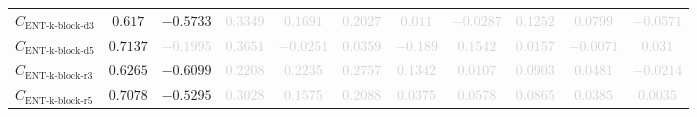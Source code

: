 \documentclass{standalone}
\newcommand{\entkblockdthreename}{\text{ENT-k-block-d3}}
\newcommand{\entkblockdthree}{C_{\entkblockdthreename}}
\newcommand{\entkblockdfivename}{\text{ENT-k-block-d5}}
\newcommand{\entkblockdfive}{C_{\entkblockdfivename}}
\newcommand{\entkblockrthreename}{\text{ENT-k-block-r3}}
\newcommand{\entkblockrthree}{C_{\entkblockrthreename}}
\newcommand{\entkblockrfivename}{\text{ENT-k-block-r5}}
\newcommand{\entkblockrfive}{C_{\entkblockrfivename}}
\begin{document}
\begin{tabular}{lcccccccccc}
$\entkblockdthree$ & $0.617$ & $-0.5733$ & \textcolor{lightgray}{$0.3349$} & \textcolor{lightgray}{$0.1691$} & \textcolor{lightgray}{$0.2027$} & \textcolor{lightgray}{$0.011$} & \textcolor{lightgray}{$-0.0287$} & \textcolor{lightgray}{$0.1252$} & \textcolor{lightgray}{$0.0799$} & \textcolor{lightgray}{$-0.0571$} \\ 
$\entkblockdfive$ & $0.7137$ & \textcolor{lightgray}{$-0.1995$} & \textcolor{lightgray}{$0.3651$} & \textcolor{lightgray}{$-0.0251$} & \textcolor{lightgray}{$0.0359$} & \textcolor{lightgray}{$-0.189$} & \textcolor{lightgray}{$0.1542$} & \textcolor{lightgray}{$0.0157$} & \textcolor{lightgray}{$-0.0071$} & \textcolor{lightgray}{$0.031$} \\ 
$\entkblockrthree$ & $0.6265$ & $-0.6099$ & \textcolor{lightgray}{$0.2208$} & \textcolor{lightgray}{$0.2235$} & \textcolor{lightgray}{$0.2757$} & \textcolor{lightgray}{$0.1342$} & \textcolor{lightgray}{$0.0107$} & \textcolor{lightgray}{$0.0903$} & \textcolor{lightgray}{$0.0481$} & \textcolor{lightgray}{$-0.0214$} \\ 
$\entkblockrfive$ & $0.7078$ & $-0.5295$ & \textcolor{lightgray}{$0.3028$} & \textcolor{lightgray}{$0.1575$} & \textcolor{lightgray}{$0.2088$} & \textcolor{lightgray}{$0.0375$} & \textcolor{lightgray}{$0.0578$} & \textcolor{lightgray}{$0.0865$} & \textcolor{lightgray}{$0.0385$} & \textcolor{lightgray}{$0.0035$} \\ 
\bottomrule
\end{tabular}
\end{document}
